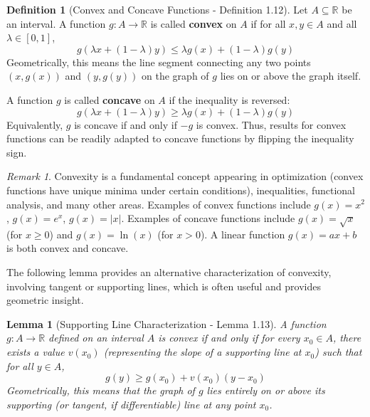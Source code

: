 \documentclass[11pt]{article}
\newtheorem{lemma}[theorem]{Lemma}
\theoremstyle{definition}
\newtheorem{definition}[theorem]{Definition}
\theoremstyle{remark}
\newtheorem{remark}[theorem]{Remark}
\newcommand{\R}{\mathbb{R}} %
\begin{document}
\begin{definition}[Convex and Concave Functions - Definition 1.12]
Let $A \subseteq \R$ be an interval. A function $g: A \to \R$ is called \textbf{convex} on $A$ if for all $x, y \in A$ and all $\lambda \in [0, 1]$,
\[
g(\lambda x + (1-\lambda)y) \le \lambda g(x) + (1-\lambda)g(y)
\]
Geometrically, this means the line segment connecting any two points $(x, g(x))$ and $(y, g(y))$ on the graph of $g$ lies on or above the graph itself.

A function $g$ is called \textbf{concave} on $A$ if the inequality is reversed:
\[
g(\lambda x + (1-\lambda)y) \ge \lambda g(x) + (1-\lambda)g(y)
\]
Equivalently, $g$ is concave if and only if $-g$ is convex. Thus, results for convex functions can be readily adapted to concave functions by flipping the inequality sign.
\end{definition}

\begin{remark}
Convexity is a fundamental concept appearing in optimization (convex functions have unique minima under certain conditions), inequalities, functional analysis, and many other areas. Examples of convex functions include $g(x)=x^2$, $g(x)=e^x$, $g(x)=|x|$. Examples of concave functions include $g(x)=\sqrt{x}$ (for $x \ge 0$) and $g(x)=\ln(x)$ (for $x > 0$). A linear function $g(x)=ax+b$ is both convex and concave.
\end{remark}

The following lemma provides an alternative characterization of convexity, involving tangent or supporting lines, which is often useful and provides geometric insight.

\begin{lemma}[Supporting Line Characterization - Lemma 1.13]
A function $g: A \to \R$ defined on an interval $A$ is convex if and only if for every $x_0 \in A$, there exists a value $v(x_0)$ (representing the slope of a supporting line at $x_0$) such that for all $y \in A$,
\[
g(y) \ge g(x_0) + v(x_0)(y-x_0)
\]
Geometrically, this means that the graph of $g$ lies entirely on or above its supporting (or tangent, if differentiable) line at any point $x_0$.
\end{lemma}
\end{document}
